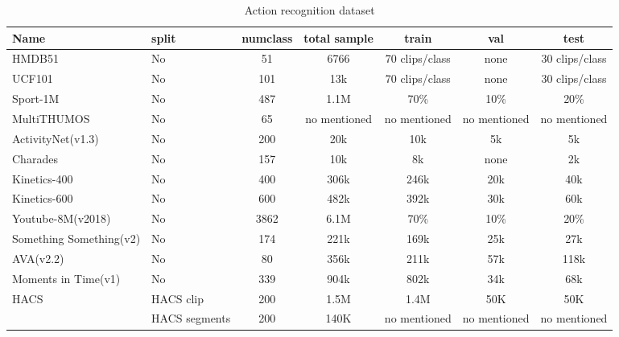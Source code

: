\documentclass[a4paper]{article}
\begin{document}
\begin{table}[h]
	\centering
	\smaller
	\caption{Action recognition dataset}
	\renewcommand{\arraystretch}{1.5}
	\begin{tabular}{l|l|c c c c c}
		\toprule
		Name                    & split         & numclass & total sample & train          & val          & test \\
		\hline
		HMDB51                  & No            & 51       & 6766         & 70 clips/class & none         & 30 clips/class         \\
		UCF101                  & No            & 101      & 13k          & 70 clips/class & none         & 30 clips/class        \\
		Sport-1M                & No            & 487      & 1.1M         & 70\%           & 10\%         & 20\%        \\
		MultiTHUMOS             & No            & 65       & no mentioned & no mentioned   & no mentioned & no mentioned    \\
		ActivityNet(v1.3)       & No            & 200      & 20k          & 10k            & 5k           & 5k         \\ 
		Charades                & No            & 157      & 10k          & 8k             & none         & 2k         \\
		Kinetics-400            & No            & 400      & 306k         & 246k           & 20k          & 40k        \\
		Kinetics-600            & No            & 600      & 482k         & 392k           & 30k          & 60k        \\
		Youtube-8M(v2018)       & No            & 3862     & 6.1M         & 70\%           & 10\%         & 20\%       \\
		Something Something(v2) & No            & 174      & 221k         & 169k           & 25k          & 27k        \\
		AVA(v2.2)               & No            & 80       & 356k         & 211k           & 57k          & 118k               \\
		Moments in Time(v1)     & No            & 339      & 904k         & 802k           & 34k          & 68k       \\
		HACS                    & HACS clip     & 200      & 1.5M         & 1.4M           & 50K          & 50K     \\
		                        & HACS segments & 200      & 140K         & no mentioned   & no mentioned & no mentioned \\

\end{tabular}
\end{table}
\end{document}

